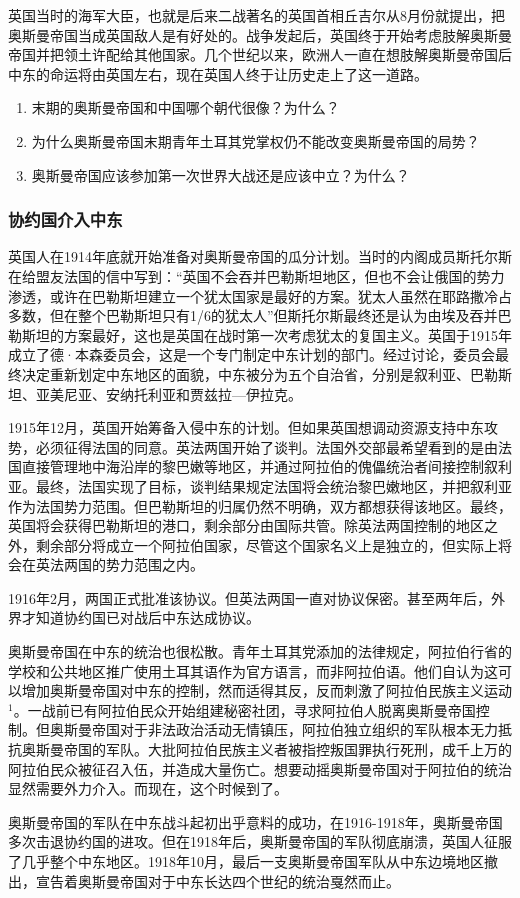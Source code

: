 \documentclass{article}
\begin{document}
英国当时的海军大臣，也就是后来二战著名的英国首相丘吉尔从8月份就提出，把奥斯曼帝国当成英国敌人是有好处的。战争发起后，英国终于开始考虑肢解奥斯曼帝国并把领土许配给其他国家。几个世纪以来，欧洲人一直在想肢解奥斯曼帝国后中东的命运将由英国左右，现在英国人终于让历史走上了这一道路。\\
\begin{enumerate}
    \small
    \item 末期的奥斯曼帝国和中国哪个朝代很像？为什么？
    \item 为什么奥斯曼帝国末期青年土耳其党掌权仍不能改变奥斯曼帝国的局势？
    \item 奥斯曼帝国应该参加第一次世界大战还是应该中立？为什么？
\end{enumerate}
\subsubsection{协约国介入中东}
\normalsize
\selectfont
英国人在1914年底就开始准备对奥斯曼帝国的瓜分计划。当时的内阁成员斯托尔斯在给盟友法国的信中写到：“英国不会吞并巴勒斯坦地区，但也不会让俄国的势力渗透，或许在巴勒斯坦建立一个犹太国家是最好的方案。犹太人虽然在耶路撒冷占多数，但在整个巴勒斯坦只有1/6的犹太人”但斯托尔斯最终还是认为由埃及吞并巴勒斯坦的方案最好，这也是英国在战时第一次考虑犹太的复国主义。英国于1915年成立了德·本森委员会，这是一个专门制定中东计划的部门。经过讨论，委员会最终决定重新划定中东地区的面貌，中东被分为五个自治省，分别是叙利亚、巴勒斯坦、亚美尼亚、安纳托利亚和贾兹拉—伊拉克。

1915年12月，英国开始筹备入侵中东的计划。但如果英国想调动资源支持中东攻势，必须征得法国的同意。英法两国开始了谈判。法国外交部最希望看到的是由法国直接管理地中海沿岸的黎巴嫩等地区，并通过阿拉伯的傀儡统治者间接控制叙利亚。最终，法国实现了目标，谈判结果规定法国将会统治黎巴嫩地区，并把叙利亚作为法国势力范围。但巴勒斯坦的归属仍然不明确，双方都想获得该地区。最终，英国将会获得巴勒斯坦的港口，剩余部分由国际共管。除英法两国控制的地区之外，剩余部分将成立一个阿拉伯国家，尽管这个国家名义上是独立的，但实际上将会在英法两国的势力范围之内。

1916年2月，两国正式批准该协议。但英法两国一直对协议保密。甚至两年后，外界才知道协约国已对战后中东达成协议。


奥斯曼帝国在中东的统治也很松散。青年土耳其党添加的法律规定，阿拉伯行省的学校和公共地区推广使用土耳其语作为官方语言，而非阿拉伯语。他们自认为这可以增加奥斯曼帝国对中东的控制，然而适得其反，反而刺激了阿拉伯民族主义运动$^1$。一战前已有阿拉伯民众开始组建秘密社团，寻求阿拉伯人脱离奥斯曼帝国控制。但奥斯曼帝国对于非法政治活动无情镇压，阿拉伯独立组织的军队根本无力抵抗奥斯曼帝国的军队。大批阿拉伯民族主义者被指控叛国罪执行死刑，成千上万的阿拉伯民众被征召入伍，并造成大量伤亡。想要动摇奥斯曼帝国对于阿拉伯的统治显然需要外力介入。而现在，这个时候到了。

奥斯曼帝国的军队在中东战斗起初出乎意料的成功，在1916-1918年，奥斯曼帝国多次击退协约国的进攻。但在1918年后，奥斯曼帝国的军队彻底崩溃，英国人征服了几乎整个中东地区。1918年10月，最后一支奥斯曼帝国军队从中东边境地区撤出，宣告着奥斯曼帝国对于中东长达四个世纪的统治戛然而止。
\end{document}
